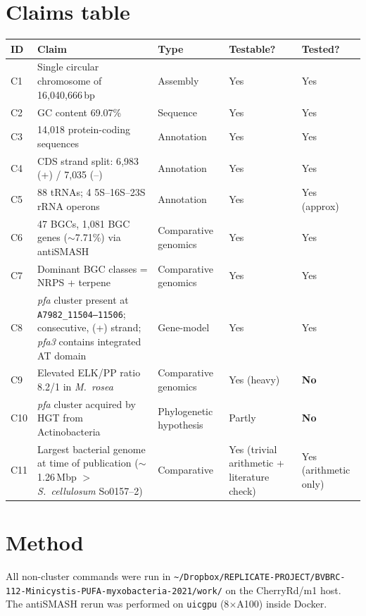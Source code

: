 \documentclass[11pt,letterpaper]{article}
\begin{document}
\section{Claims table}

\begin{longtable}{@{}p{0.5cm}p{9.3cm}p{2.2cm}p{1.4cm}p{1.4cm}@{}}
\toprule
ID & Claim & Type & Testable? & Tested? \\
\midrule
\endhead
C1 & Single circular chromosome of 16{,}040{,}666\,bp & Assembly & Yes & Yes \\
C2 & GC content 69.07\% & Sequence & Yes & Yes \\
C3 & 14{,}018 protein-coding sequences & Annotation & Yes & Yes \\
C4 & CDS strand split: 6{,}983 (+) / 7{,}035 (--) & Annotation & Yes & Yes \\
C5 & 88 tRNAs; 4 5S--16S--23S rRNA operons & Annotation & Yes & Yes (approx) \\
C6 & 47 BGCs, 1{,}081 BGC genes ($\sim$7.71\%) via antiSMASH & Comparative genomics & Yes & Yes \\
C7 & Dominant BGC classes = NRPS + terpene & Comparative genomics & Yes & Yes \\
C8 & \emph{pfa} cluster present at \texttt{A7982\_11504--11506}; consecutive, (+) strand; \emph{pfa3} contains integrated AT domain & Gene-model & Yes & Yes \\
C9 & Elevated ELK/PP ratio 8.2/1 in \emph{M.\ rosea} & Comparative genomics & Yes (heavy) & \textbf{No} \\
C10 & \emph{pfa} cluster acquired by HGT from Actinobacteria & Phylogenetic hypothesis & Partly & \textbf{No} \\
C11 & Largest bacterial genome at time of publication ($\sim$1.26\,Mbp $>$ \emph{S.\ cellulosum} So0157--2) & Comparative & Yes (trivial arithmetic + literature check) & Yes (arithmetic only) \\
\bottomrule
\end{longtable}

\section{Method}

All non-cluster commands were run in \texttt{\textasciitilde/Dropbox/REPLICATE-PROJECT/BVBRC-112-Minicystis-PUFA-myxobacteria-2021/work/} on the CherryRd/m1 host. The antiSMASH rerun was performed on \texttt{uicgpu} (8$\times$A100) inside Docker.
\end{document}

